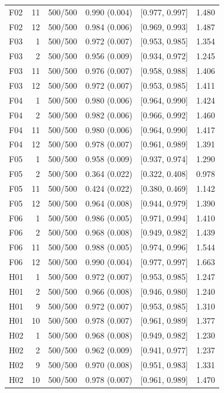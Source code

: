 \begin{longtable}[t]{lrllll}
F02 & 11 & 500/500 & 0.990 (0.004) & {}[0.977, 0.997] & 1.480\\
F02 & 12 & 500/500 & 0.984 (0.006) & {}[0.969, 0.993] & 1.487\\
F03 & 1 & 500/500 & 0.972 (0.007) & {}[0.953, 0.985] & 1.354\\
F03 & 2 & 500/500 & 0.956 (0.009) & {}[0.934, 0.972] & 1.245\\
F03 & 11 & 500/500 & 0.976 (0.007) & {}[0.958, 0.988] & 1.406\\
F03 & 12 & 500/500 & 0.972 (0.007) & {}[0.953, 0.985] & 1.411\\
F04 & 1 & 500/500 & 0.980 (0.006) & {}[0.964, 0.990] & 1.424\\
F04 & 2 & 500/500 & 0.982 (0.006) & {}[0.966, 0.992] & 1.460\\
F04 & 11 & 500/500 & 0.980 (0.006) & {}[0.964, 0.990] & 1.417\\
F04 & 12 & 500/500 & 0.978 (0.007) & {}[0.961, 0.989] & 1.391\\
F05 & 1 & 500/500 & 0.958 (0.009) & {}[0.937, 0.974] & 1.290\\
F05 & 2 & 500/500 & 0.364 (0.022) & {}[0.322, 0.408] & 0.978\\
F05 & 11 & 500/500 & 0.424 (0.022) & {}[0.380, 0.469] & 1.142\\
F05 & 12 & 500/500 & 0.964 (0.008) & {}[0.944, 0.979] & 1.390\\
F06 & 1 & 500/500 & 0.986 (0.005) & {}[0.971, 0.994] & 1.410\\
F06 & 2 & 500/500 & 0.968 (0.008) & {}[0.949, 0.982] & 1.439\\
F06 & 11 & 500/500 & 0.988 (0.005) & {}[0.974, 0.996] & 1.544\\
F06 & 12 & 500/500 & 0.990 (0.004) & {}[0.977, 0.997] & 1.663\\
H01 & 1 & 500/500 & 0.972 (0.007) & {}[0.953, 0.985] & 1.247\\
H01 & 2 & 500/500 & 0.966 (0.008) & {}[0.946, 0.980] & 1.240\\
H01 & 9 & 500/500 & 0.972 (0.007) & {}[0.953, 0.985] & 1.310\\
H01 & 10 & 500/500 & 0.978 (0.007) & {}[0.961, 0.989] & 1.377\\
H02 & 1 & 500/500 & 0.968 (0.008) & {}[0.949, 0.982] & 1.230\\
H02 & 2 & 500/500 & 0.962 (0.009) & {}[0.941, 0.977] & 1.237\\
H02 & 9 & 500/500 & 0.970 (0.008) & {}[0.951, 0.983] & 1.331\\
H02 & 10 & 500/500 & 0.978 (0.007) & {}[0.961, 0.989] & 1.470\\

\end{longtable}
